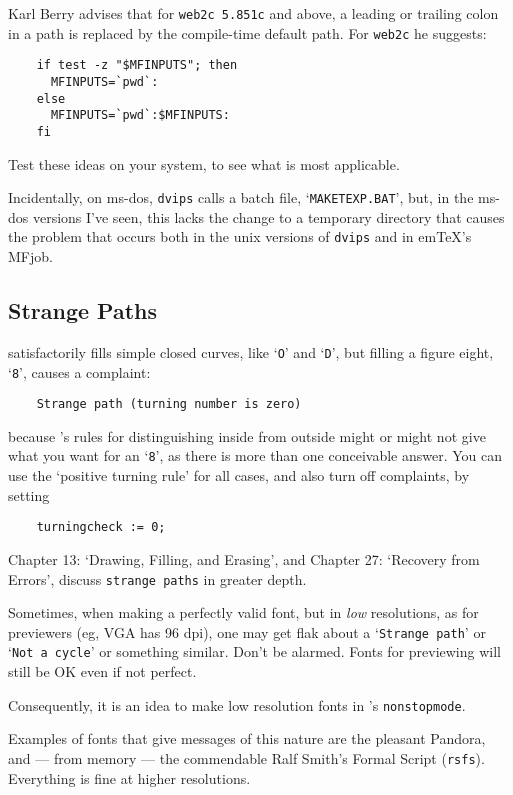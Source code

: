 Karl {\sc Berry} advises that for {\tt web2c 5.851c} and above,
a leading or trailing colon in a path is replaced by the compile-time
default path.  For {\tt web2c} he suggests:
\begin{verbatim}
    if test -z "$MFINPUTS"; then
      MFINPUTS=`pwd`:
    else
      MFINPUTS=`pwd`:$MFINPUTS:
    fi
\end{verbatim}

Test these ideas on your system, to see what is most applicable.

Incidentally, on {\sc ms-dos}, {\tt dvips} calls a batch file,
`{\tt MAKETEXP.BAT}', but, in the {\sc ms-dos} versions I've seen,
this lacks the change to a temporary directory that causes
the problem that occurs both in the {\sc unix} versions of {\tt dvips}
and in em\TeX{}'s MFjob.


\subsection{Strange Paths}

\MF{} satisfactorily fills simple closed curves, like `{\tt O}'
and `{\tt D}', but filling a figure eight, `{\tt 8}', causes a
complaint:
\begin{verbatim}
    Strange path (turning number is zero)
\end{verbatim}
because \MF{}'s rules for distinguishing inside from outside
might or might not give what you want for an `{\tt 8}', as there is
more than one conceivable answer.  You can use the `positive turning
rule' for all cases, and also turn off complaints, by setting
\begin{verbatim}
    turningcheck := 0;
\end{verbatim}
Chapter 13:  `Drawing, Filling, and Erasing', and Chapter 27:
`Recovery from Errors', discuss {\tt strange paths} in greater
depth.


Sometimes, when making a perfectly valid font, but in {\em low}
resolutions, as for previewers (eg, VGA has 96 dpi), one may get
flak about a `{\tt Strange path}' or `{\tt Not a cycle}' or
something similar.  Don't be alarmed.  Fonts for previewing will
still be OK even if not perfect.  

Consequently, it is an idea to make low resolution fonts in
\MF{}'s \hbox{\tt nonstopmode}.

Examples of fonts that give messages of this nature are the pleasant
Pandora, and --- from memory --- the commendable Ralf Smith's
Formal Script ({\tt rsfs}).  Everything is fine at higher resolutions.

